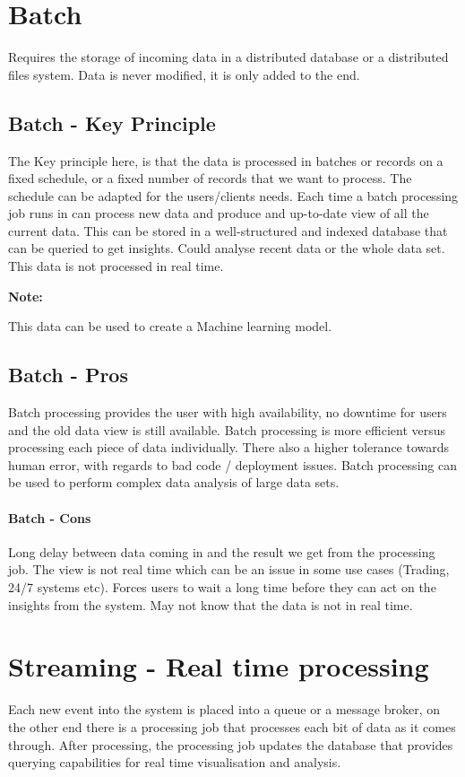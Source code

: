 \documentclass[a4paper, 11pt]{book}
\newenvironment{note}{
    \begin{siderule}
        \textbf{Note: }
        }{
    \end{siderule}}
\begin{document}
    \section{Batch}
    Requires the storage of incoming data in a distributed database or a distributed files system.
    Data is never modified, it is only added to the end.

    \subsection{Batch - Key Principle}
    The Key principle here, is that the data is processed in batches or records on a fixed schedule, or a fixed number of records that we want to process.
    The schedule can be adapted for the users/clients needs.
    Each time a batch processing job runs in can process new data and produce and up-to-date view of all the current data.
    This can be stored in a well-structured and indexed database that can be queried to get insights.
    Could analyse recent data or the whole data set.
    This data is not processed in real time.

    \begin{note}
        This data can be used to create a Machine learning model.
    \end{note}

    \subsection{Batch - Pros}
    Batch processing provides the user with high availability, no downtime for users and the old data view is still available.
    Batch processing is more efficient versus processing each piece of data individually.
    There also a higher tolerance towards human error, with regards to bad code / deployment issues.
    Batch processing can be used to perform complex data analysis of large data sets.

    \paragraph{Batch - Cons}
    Long delay between data coming in and the result we get from the processing job.
    The view is not real time which can be an issue in some use cases (Trading, 24/7 systems etc).
    Forces users to wait a long time before they can act on the insights from the system.
    May not know that the data is not in real time.


    \section{Streaming - Real time processing}
    Each new event into the system is placed into a queue or a message broker, on the other end there is a processing job that processes each bit of data as it comes through.
    After processing, the processing job updates the database that provides querying capabilities for real time visualisation and analysis.
\end{document}
